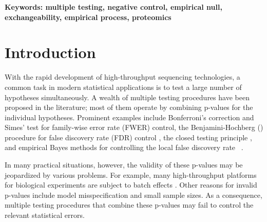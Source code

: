 \documentclass[a4paper,11pt]{article}
\theoremstyle{plain}
\theoremstyle{definition}
\theoremstyle{plain}
\newcommand{\localFDR}{\text{local-FDR}}
\newcommand{\BH}{{\text{BH}}}
\begin{document}
\noindent\textbf{Keywords: multiple testing, negative control,
  empirical null, exchangeability, empirical process, proteomics}

\clearpage


\section{Introduction}\label{sec:introduction}


With the rapid development of high-throughput sequencing technologies,
a common task in modern statistical applications is to test a large
number of hypotheses simultaneously. A wealth of multiple testing
procedures have been proposed in the literature; most of them operate
by combining p-values for the individual hypotheses. Prominent
examples include Bonferroni's correction and Simes' test
\parencite{simes1986improved} for family-wise error rate (FWER) control,
the Benjamini-Hochberg (\BH) procedure for false discovery rate (FDR)
control \parencite{benjamini1995controlling}, the closed testing
principle \parencite{marcus1976closed}, and empirical Bayes methods
for controlling the local false discovery rate \localFDR\
\parencite{efron2001empirical}.

In many practical situations, however, the validity of these p-values
may be jeopardized by various problems. For example, many high-throughput
platforms for biological experiments are subject to batch effects
\parencite{leek10_tackl_wides_critic_impac_batch}. Other reasons for
invalid p-values include model misspecification and small sample
sizes. As a consequence, multiple testing procedures that combine
these p-values may fail to control the relevant statistical errors.
\end{document}
